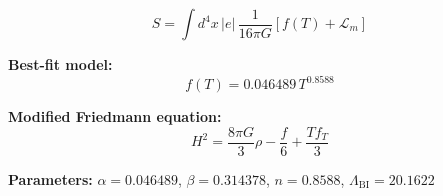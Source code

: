 
\begin{equation}
  S = \int d^4x \, |e| \, \frac{1}{16\pi G} \left[ f(T) + \mathcal{L}_m \right]
\end{equation}

\textbf{Best-fit model:}
\begin{equation}
  f(T) = 0.046489 \, T^{0.8588}
\end{equation}

\textbf{Modified Friedmann equation:}
\begin{equation}
  H^2 = \frac{8\pi G}{3} \rho - \frac{f}{6} + \frac{T f_T}{3}
\end{equation}

\textbf{Parameters:}
$\alpha = 0.046489$, \quad
$\beta = 0.314378$, \quad
$n = 0.8588$, \quad
$\Lambda_{\text{BI}} = 20.1622$